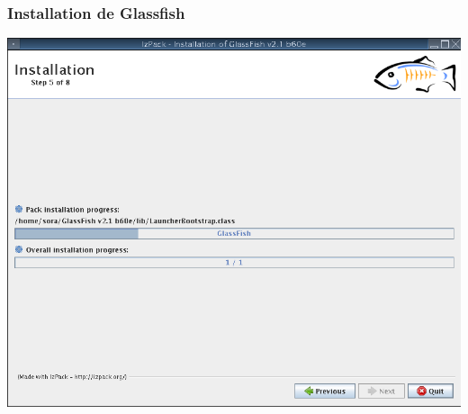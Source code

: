 \begin{frame}\frametitle{Installation de Glassfish}
	\centering
	\includegraphics[width=\linewidth]{../image/installationGlassfish.png}
\end{frame}
